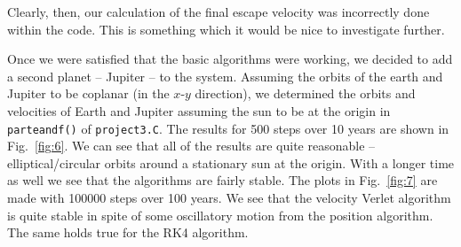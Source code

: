 \documentclass[12pt]{article}
\numberwithin{equation}{section}
\begin{document}
\noindent Clearly, then, our calculation of the final escape velocity was incorrectly done within the code.  This is something which it would be nice to investigate further.
\par Once we were satisfied that the basic algorithms were working, we decided to add a second planet -- Jupiter -- to the system.  Assuming the orbits of the earth and Jupiter to be coplanar (in the $x$-$y$ direction), we determined the orbits and velocities of Earth and Jupiter assuming the sun to be at the origin in \texttt{parteandf()} of \texttt{project3.C}.  The results for 500 steps over 10 years are shown in Fig.~\ref{fig:6}.  We can see that all of the results are quite reasonable -- elliptical/circular orbits around a stationary sun at the origin.  With a longer time as well we see that the algorithms are fairly stable.  The plots in  Fig.~\ref{fig:7} are made with 100000 steps over 100 years.  We see that the velocity Verlet algorithm is quite stable in spite of some oscillatory motion from the position algorithm.  The same holds true for the RK4 algorithm.
\end{document}

